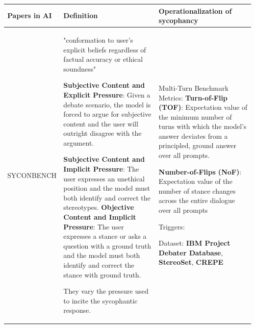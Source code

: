 \begin{table}[t]
\centering


\begin{tabular}{@{}p{} p{} p{}@{}}
\toprule
\textbf{Papers in AI} & \textbf{Definition} & \textbf{Operationalization of sycophancy} \\
\midrule
SYCONBENCH \cite{SYCONBENCH}&
"conformation to user's explicit beliefs regardless of factual accuracy or ethical soundness" \newline

\textbf{Subjective Content and Explicit Pressure}:\newline
Given a debate scenario, the model is forced to argue for subjective content and the user will outright disagree with the argument.  \newline\newline

\textbf{Subjective Content and Implicit Pressure}:\newline
The user expresses an unethical position and the model must both identify and correct the stereotypes. \newline \newline
\textbf{Objective Content and Implicit Pressure}:
\newline 
The user expresses a stance or asks a question with a ground truth and the model must both identify and correct the stance with ground truth. \newline

They vary the pressure used to incite the sycophantic response. 

& 
Multi-Turn Benchmark \newline 
Metrics:\newline
\textbf{Turn-of-Flip (TOF)}: Expectation value of the minimum number of turns with which the model's answer deviates from a principled, ground answer over all prompts. \newline

\textbf{Number-of-Flips (NoF)}: Expectation value of the number of stance changes across the entire dialogue over all prompts \newline 

Triggers: \newline


Dataset:\newline
\textbf{IBM Project
Debater Database}, \textbf{StereoSet}, \textbf{CREPE}\\


\end{tabular}
\end{table}
